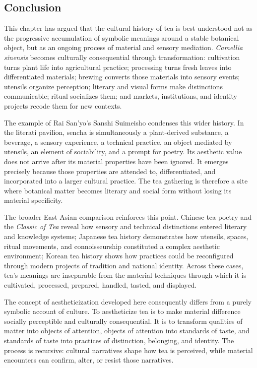 \documentclass[numbers]{IntechOpen-Book}
\begin{document}
\begin{backmatter}
\section{Conclusion}

This chapter has argued that the cultural history of tea is best understood not as the progressive accumulation of symbolic meanings around a stable botanical object, but as an ongoing process of material and sensory mediation. \textit{Camellia sinensis} becomes culturally consequential through transformation: cultivation turns plant life into agricultural practice; processing turns fresh leaves into differentiated materials; brewing converts those materials into sensory events; utensils organize perception; literary and visual forms make distinctions communicable; ritual socializes them; and markets, institutions, and identity projects recode them for new contexts.

The example of Rai San'yo's Sanshi Suimeisho condenses this wider history. In the literati pavilion, sencha is simultaneously a plant-derived substance, a beverage, a sensory experience, a technical practice, an object mediated by utensils, an element of sociability, and a prompt for poetry. Its aesthetic value does not arrive after its material properties have been ignored. It emerges precisely because those properties are attended to, differentiated, and incorporated into a larger cultural practice. The tea gathering is therefore a site where botanical matter becomes literary and social form without losing its material specificity.

The broader East Asian comparison reinforces this point. Chinese tea poetry and the \textit{Classic of Tea} reveal how sensory and technical distinctions entered literary and knowledge systems; Japanese tea history demonstrates how utensils, spaces, ritual movements, and connoisseurship constituted a complex aesthetic environment; Korean tea history shows how practices could be reconfigured through modern projects of tradition and national identity. Across these cases, tea's meanings are inseparable from the material techniques through which it is cultivated, processed, prepared, handled, tasted, and displayed.

The concept of aestheticization developed here consequently differs from a purely symbolic account of culture. To aestheticize tea is to make material difference socially perceptible and culturally consequential. It is to transform qualities of matter into objects of attention, objects of attention into standards of taste, and standards of taste into practices of distinction, belonging, and identity. The process is recursive: cultural narratives shape how tea is perceived, while material encounters can confirm, alter, or resist those narratives.


\end{backmatter}
\end{document}
